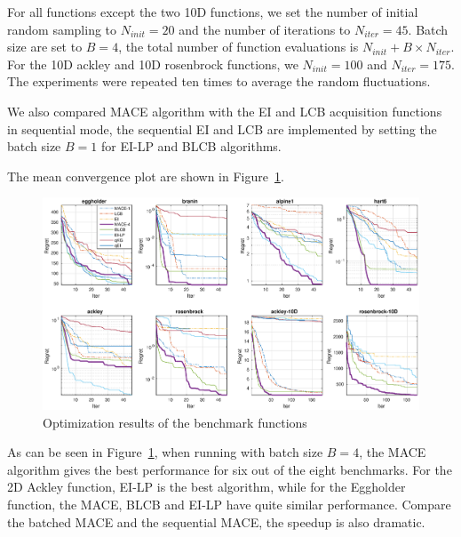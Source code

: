For all functions except the two 10D functions, we set the number of initial
random sampling to $N_{init} = 20$ and the number of iterations to $N_{iter} =
45$. Batch size are set to $B = 4$, the total number of function evaluations is
$N_{init} + B \times N_{iter}$. For the 10D ackley and 10D rosenbrock functions, we
$N_{init} = 100$ and $N_{iter} = 175$. The experiments were repeated ten
times to average the random fluctuations. 

We also compared MACE algorithm with the EI and LCB acquisition functions in
sequential mode, the sequential EI and LCB are implemented by setting the batch
size $B = 1$ for EI-LP and BLCB algorithms.

The mean convergence plot are shown in Figure~\ref{fig:CovPlotBenchmark}.

\begin{figure}[htbp]
    \vskip 0.2in
    \begin{center}
        \centerline{\includegraphics[width=1.0\linewidth]{./img/convplot.eps}}
        \caption{Optimization results of the benchmark functions}
        \label{fig:CovPlotBenchmark}
    \end{center}
    \vskip -0.2in
\end{figure}

As can be seen in Figure~\ref{fig:CovPlotBenchmark}, when running with batch
size $B = 4$, the MACE algorithm gives the best performance for six out of the
eight benchmarks. For the 2D Ackley function, EI-LP is the best algorithm,
while for the Eggholder function, the MACE, BLCB and EI-LP have quite similar
performance. Compare the batched MACE and the sequential MACE, the speedup is
also dramatic.

